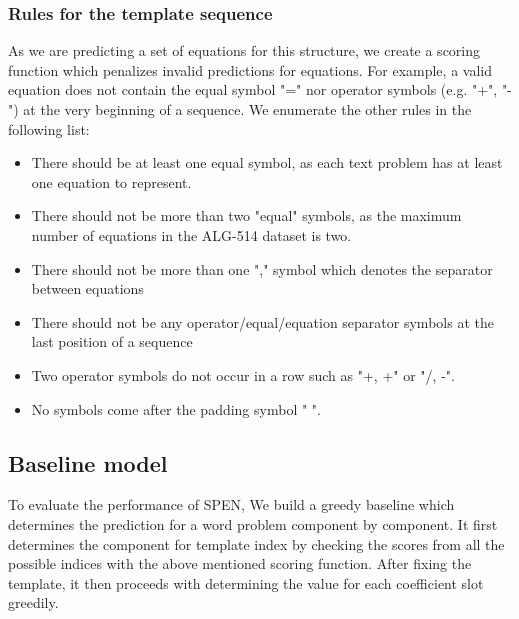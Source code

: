 \documentclass[11pt,letterpaper]{article}
\begin{document}
\subsubsection{Rules for the template sequence}
As we are predicting a set of equations for this structure, we create a scoring function which penalizes invalid predictions for equations. For example, a valid equation does not contain the equal symbol "=" nor operator symbols (e.g. "+", "-") at the very beginning of a sequence. We enumerate the other rules in the following list:
\begin{itemize}
\item There should be at least one equal symbol, as each text problem has at least one equation to represent.
\item There should not be more than two "equal" symbols, as the maximum number of equations in the ALG-514 dataset is two.
\item There should not be more than one "," symbol which denotes the separator between equations
\item There should not be any operator/equal/equation separator symbols at the last position of a sequence
\item Two operator symbols do not occur in a row such as "+, +" or "/, -".
\item No symbols come after the padding symbol " ".
\end{itemize}
% 
\subsection{Baseline model}
To evaluate the performance of SPEN, We build a greedy baseline which determines the prediction for a word problem component by component. It first determines the component for template index by checking the scores from all the possible indices with the above mentioned scoring function. After fixing the template, it then proceeds with determining the value for each coefficient slot greedily.
\end{document}
